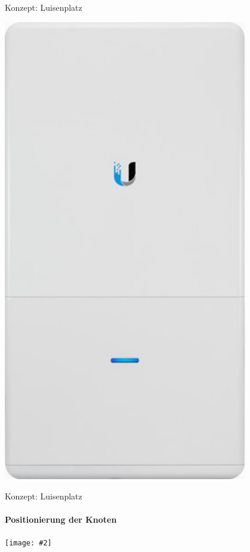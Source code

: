 \documentclass{beamer}
\newcommand{\centeredimage}[2][ ]{
        \begin{center}
            \texttt{[image: \#2]} $\;$

            \tiny{#1}
        \end{center}
}
\begin{document}
\begin{frame}{Konzept: Luisenplatz}
\begin{minipage}{0.4\textwidth}
\includegraphics[width=0.8\textwidth]{images/unifi-ap-ac-outdoor.jpg}
\end{minipage}



\end{frame}
\begin{frame}{Konzept: Luisenplatz}
\framesubtitle{Positionierung der Knoten}

\centeredimage{images/plan_luisenplatz2.jpg}
\end{frame}
\end{document}
